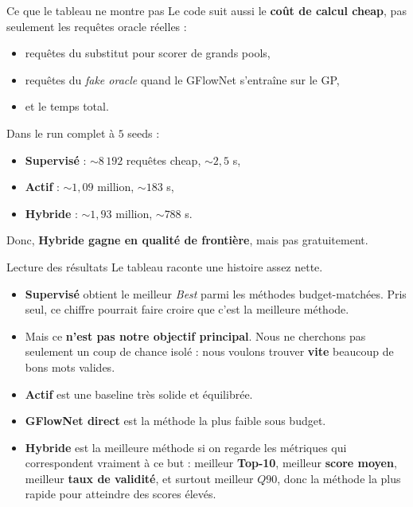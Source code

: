 \documentclass[aspectratio=169,10pt]{beamer}
\begin{document}
\begin{frame}{Ce que le tableau ne montre pas}
\justifying
Le code suit aussi le \textbf{coût de calcul cheap}, pas seulement les requêtes
oracle réelles :
\begin{itemize}
  \item requêtes du substitut pour scorer de grands pools,
  \item requêtes du \emph{fake oracle} quand le GFlowNet s'entraîne sur le GP,
  \item et le temps total.
\end{itemize}

\vspace{0.5em}
Dans le run complet à \(5\) seeds :
\begin{itemize}
  \item \textbf{Supervisé} : \(\sim 8\,192\) requêtes cheap, \(\sim 2{,}5\) s,
  \item \textbf{Actif} : \(\sim 1{,}09\) million, \(\sim 183\) s,
  \item \textbf{Hybride} : \(\sim 1{,}93\) million, \(\sim 788\) s.
\end{itemize}

\vspace{0.5em}
Donc, \textbf{Hybride gagne en qualité de frontière}, mais pas gratuitement.
\end{frame}

\begin{frame}{Lecture des résultats}
\justifying
Le tableau raconte une histoire assez nette.

\begin{itemize}
  \item \textbf{Supervisé} obtient le meilleur \emph{Best} parmi les méthodes
  budget-matchées. Pris seul, ce chiffre pourrait faire croire que c'est la
  meilleure méthode.
  \item Mais ce \textbf{n'est pas notre objectif principal}. Nous ne cherchons
  pas seulement un coup de chance isolé : nous voulons trouver \textbf{vite}
  beaucoup de bons mots valides.
  \item \textbf{Actif} est une baseline très solide et équilibrée.
  \item \textbf{GFlowNet direct} est la méthode la plus faible sous budget.
  \item \textbf{Hybride} est la meilleure méthode si on regarde les métriques
  qui correspondent vraiment à ce but : meilleur \textbf{Top-10}, meilleur
  \textbf{score moyen}, meilleur \textbf{taux de validité}, et surtout
  meilleur \textbf{\(Q90\)}, donc la méthode la plus rapide pour atteindre des
  scores élevés.
\end{itemize}
\end{frame}
\end{document}
